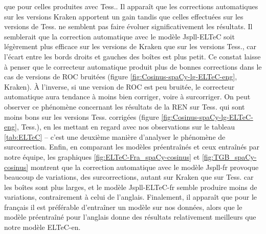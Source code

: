 que pour celles produites avec Tess.. Il apparaît 
que les corrections automatiques sur les versions Kraken apportent un gain tandis que celles effectuées sur les versions de Tess. ne semblent pas faire évoluer significativement les résultats.
Il semblerait que la correction automatique avec le modèle Jspll-ELTeC soit légèrement plus efficace sur les versions de Kraken que sur les versions Tess., car l'écart entre les bords droits et gauches des boîtes est plus petit. Ce constat laisse à penser que le correcteur automatique produit plus de bonnes corrections dans le cas de versions de ROC bruitées
(figure \ref{fig:Cosinus-spaCy-lg-ELTeC-eng}, Kraken). À l'inverse, si une version de ROC est peu bruitée, le correcteur automatique aura tendance à moins bien corriger, voire à surcorriger. 
On peut observer ce phénomène concernant les résultats de la REN sur Tess. qui sont moins bons sur les versions Tess. corrigées (figure \ref{fig:Cosinus-spaCy-lg-ELTeC-eng}, Tess.), 
en les mettant en regard avec nos observations sur le tableau \ref{tab:ELTeC} -- c'est une deuxième manière d'analyser le phénomène de surcorrection. 
Enfin, en comparant les modèles préentraînés et ceux entraînés par notre équipe,
les graphiques \ref{fig:ELTeC-Fra_spaCy-cosinus} et \ref{fig:TGB_spaCy-cosinus} montrent que la correction automatique avec le modèle Jspll-fr provoque beaucoup de variations, des surcorrections, autant sur Kraken que sur Tess. car les boîtes sont plus larges, et le modèle Jspll-ELTeC-fr semble produire moins de variations, contrairement à celui de l'anglais. 
Finalement, il apparaît que pour le français il est préférable d'entraîner un modèle sur nos données, alors que le modèle préentraîné pour l'anglais donne des résultats relativement meilleurs que notre modèle ELTeC-en.  



